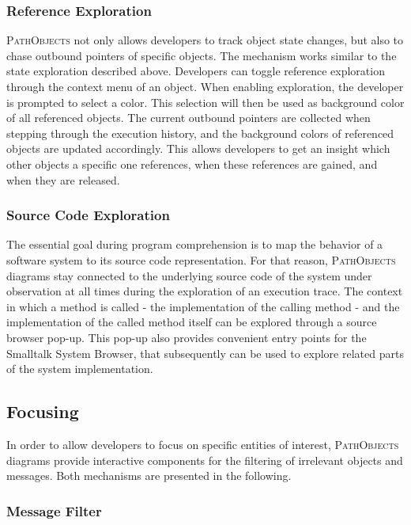 \subsubsection{Reference Exploration}
\textsc{PathObjects} not only allows developers to track object state changes, but also to chase outbound pointers of specific objects.
The mechanism works similar to the state exploration described above.
Developers can toggle reference exploration through the context menu of an object.
When enabling exploration, the developer is prompted to select a color.
This selection will then be used as background color of all referenced objects.
The current outbound pointers are collected when stepping through the execution history, and the background colors of referenced objects are updated accordingly.
This allows developers to get an insight which other objects a specific one references, when these references are gained, and when they are released.

\subsubsection{Source Code Exploration}
The essential goal during program comprehension is to map the behavior of a software system to its source code representation.
For that reason, \textsc{PathObjects} diagrams stay connected to the underlying source code of the system under observation at all times during the exploration of an execution trace.
The context in which a method is called - the implementation of the calling method - and the implementation of the called method itself can be explored through a source browser pop-up.
This pop-up also provides convenient entry points for the Smalltalk System Browser, that subsequently can be used to explore related parts of the system implementation.

\subsection{Focusing}
\label{ss:ApproachInteractiveFocusing}
In order to allow developers to focus on specific entities of interest, \textsc{PathObjects} diagrams provide interactive components for the filtering of irrelevant objects and messages.
Both mechanisms are presented in the following.

\subsubsection{Message Filter}

